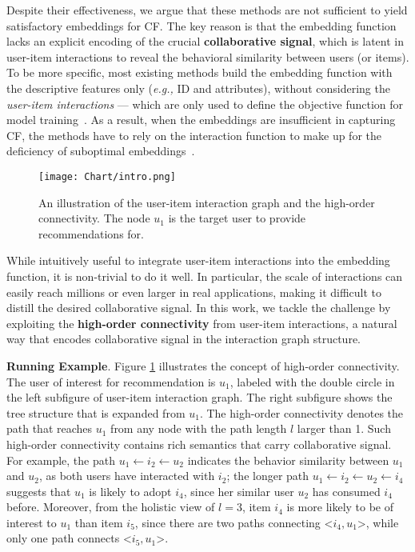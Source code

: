 \documentclass[sigconf]{acmart}
\newcommand{\eg}{\emph{e.g., }}
\theoremstyle{definition}
\begin{document}
Despite their effectiveness, we argue that these methods are not sufficient to yield 
satisfactory embeddings for CF. The key reason is that the embedding function lacks an explicit encoding of the crucial \textbf{collaborative signal}, which is latent in user-item interactions to reveal the behavioral similarity between users (or items). To be more specific, most existing methods build the embedding function with the descriptive features only (\eg ID and attributes), 
without considering the
\textit{user-item interactions} --- which are only used to define the objective function for model training~\cite{BPRMF,tay2018latent}. 
As a result, when the embeddings are insufficient in capturing CF, the methods have to rely on the interaction function to make up for the deficiency of suboptimal embeddings~\cite{NCF}. 

\begin{figure}[t]
    \centering
	\texttt{[image: Chart/intro.png]}
	\vspace{-10pt}
	\caption{An illustration of the user-item interaction graph and the high-order connectivity. The node $u_1$ is the target user to provide recommendations for.}
	\label{fig:intro}
	\vspace{-15pt}
\end{figure}

While intuitively useful to integrate user-item interactions into the embedding function, it is non-trivial to do it well. In particular, the scale of interactions can easily reach millions or even larger in real applications, making it difficult to distill the desired collaborative signal. 
In this work, we tackle the challenge by exploiting the \textbf{high-order connectivity} from user-item interactions, a natural way that encodes collaborative signal in the interaction graph structure.


\vspace{+5pt}
\noindent\textbf{Running Example}. Figure \ref{fig:intro} illustrates the concept of high-order connectivity. The user of interest for recommendation is $u_1$, labeled with the double circle in the left subfigure of user-item interaction graph. The right subfigure shows the tree structure that is expanded from $u_1$. The high-order connectivity denotes the path that reaches $u_1$ from any node with the path length $l$ larger than 1. Such high-order connectivity contains rich semantics that carry collaborative signal. 
For example, the path $u_{1}\leftarrow i_{2}\leftarrow u_{2}$ indicates the behavior similarity between $u_1$ and $u_2$, as both users have interacted with $i_2$; the longer path $u_{1}\leftarrow i_{2}\leftarrow u_{2}\leftarrow i_4$ suggests that $u_1$ is likely to adopt $i_4$, since her similar user $u_2$ has consumed $i_4$ before. Moreover, from the holistic view of $l=3$, item $i_4$ is more likely to be of interest to $u_1$ than item $i_5$, since there are two paths connecting <$i_4, u_1$>, while only one path connects <$i_5, u_1$>.
\end{document}
